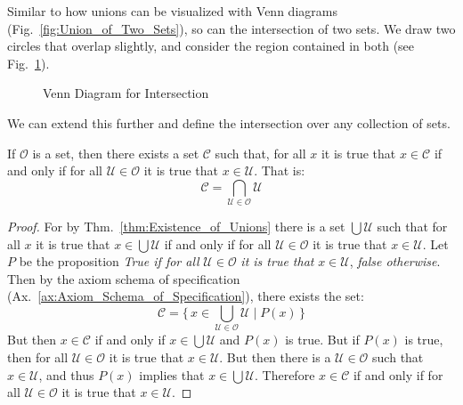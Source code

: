         Similar to how unions can be visualized with Venn diagrams
        (Fig.~\ref{fig:Union_of_Two_Sets}), so can the intersection of
        two sets. We draw two circles that overlap slightly, and consider the
        region contained in both (see Fig.~\ref{fig:Intersection_of_Two_Sets}).
        \begin{figure}[H]
            \centering
            
            \caption{Venn Diagram for Intersection}
            \label{fig:Intersection_of_Two_Sets}
        \end{figure}
        We can extend this further and define the intersection over any
        collection of sets.
        \begin{theorem}
            \label{thm:Existence_of_Arbitrary_Intersetions}%
            If $\mathcal{O}$ is a set, then there exists a set
            $\mathcal{C}$ such that, for all $x$ it is true that
            $x\in\mathcal{C}$ if and only if for all
            $\mathcal{U}\in\mathcal{O}$ it is true that $x\in\mathcal{U}$.
            That is:
            \begin{equation}
                \mathcal{C}=\bigcap_{\mathcal{U}\in\mathcal{O}}\mathcal{U}
            \end{equation}
        \end{theorem}
        \begin{proof}
            For by Thm.~\ref{thm:Existence_of_Unions} there is a set
            $\bigcup\mathcal{U}$ such that for all $x$ it is true that
            $x\in\bigcup\mathcal{U}$ if and only if for all
            $\mathcal{U}\in\mathcal{O}$ it is true that $x\in\mathcal{U}$. Let
            $P$ be the proposition \textit{True if for all}
            $\mathcal{U}\in\mathcal{O}$ \textit{it is true that}
            $x\in\mathcal{U}$, \textit{false otherwise}. Then by the
            axiom schema of specification
            (Ax.~\ref{ax:Axiom_Schema_of_Specification}), there exists the set:
            \begin{equation}
                \mathcal{C}
                =\Big\{\,x\in\bigcup_{\mathcal{U}\in\mathcal{O}}\mathcal{U}
                    \;|\;P(x)\,\Big\}
            \end{equation}
            But then $x\in\mathcal{C}$ if and only if $x\in\bigcup\mathcal{U}$
            and $P(x)$ is true. But if $P(x)$ is true, then for all
            $\mathcal{U}\in\mathcal{O}$ it is true that $x\in\mathcal{U}$. But
            then there is a $\mathcal{U}\in\mathcal{O}$ such that
            $x\in\mathcal{U}$, and thus $P(x)$ implies that
            $x\in\bigcup\mathcal{U}$. Therefore $x\in\mathcal{C}$ if and only if
            for all $\mathcal{U}\in\mathcal{O}$ it is true that
            $x\in\mathcal{U}$.
        \end{proof}
